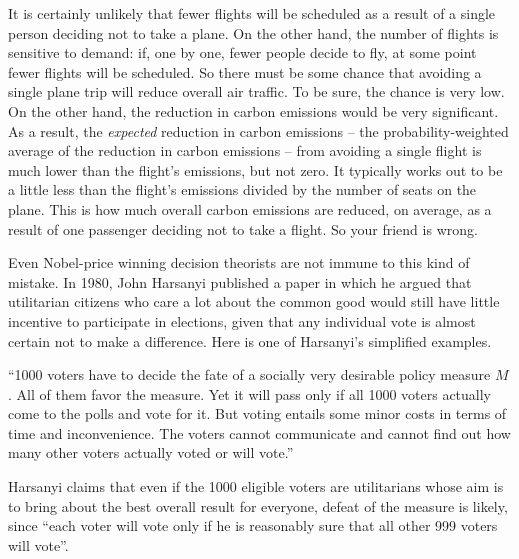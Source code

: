 It is certainly unlikely that fewer flights will be scheduled as a
result of a single person deciding not to take a plane. On the other
hand, the number of flights is sensitive to demand: if, one by one,
fewer people decide to fly, at some point fewer flights will be
scheduled. So there must be some chance that avoiding a single plane
trip will reduce overall air traffic. To be sure, the chance is very
low. On the other hand, the reduction in carbon emissions would be
very significant. As a result, the \emph{expected} reduction in carbon
emissions -- the probability-weighted average of the reduction in
carbon emissions -- from avoiding a single flight is much lower than
the flight's emissions, but not zero. It typically works out to be a
little less than the flight's emissions divided by the number of seats
on the plane. This is how much overall carbon emissions are reduced,
on average, as a result of one passenger deciding not to take a
flight. So your friend is wrong.

Even Nobel-price winning decision theorists are not immune to this
kind of mistake. In 1980, John Harsanyi published a paper in which he
argued that utilitarian citizens who care a lot about the common good
would still have little incentive to participate in elections, given
that any individual vote is almost certain not to make a
difference. Here is one of Harsanyi's simplified examples.

\begin{example}
  ``1000 voters have to decide the fate of a socially very desirable
  policy measure $M$. All of them favor the measure. Yet it will pass
  only if all 1000 voters actually come to the polls and vote for
  it. But voting entails some minor costs in terms of time and
  inconvenience. The voters cannot communicate and cannot find out how
  many other voters actually voted or will vote.''
\end{example}

Harsanyi claims that even if the 1000 eligible voters are utilitarians
whose aim is to bring about the best overall result for everyone,
defeat of the measure is likely, since ``each voter will vote only if
he is reasonably sure that all other 999 voters will vote''.


